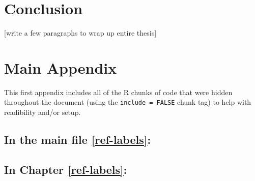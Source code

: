 \documentclass[12pt, twoside]{amherstthesis}
\begin{document}
\hypertarget{conclusion}{%
\chapter{Conclusion}\label{conclusion}}

{[}write a few paragraphs to wrap up entire thesis{]}

\appendix

\hypertarget{main-appendix}{%
\chapter{Main Appendix}\label{main-appendix}}

This first appendix includes all of the R chunks of code that were hidden throughout the document (using the \texttt{include\ =\ FALSE} chunk tag) to help with readibility and/or setup.

\hypertarget{in-the-main-file-refref-labels}{%
\section{In the main file \ref{ref-labels}:}\label{in-the-main-file-refref-labels}}

\hypertarget{in-chapter-refref-labels}{%
\section{In Chapter \ref{ref-labels}:}\label{in-chapter-refref-labels}}
\end{document}
